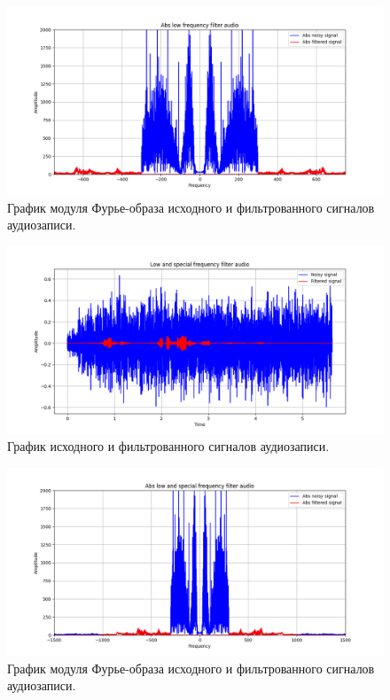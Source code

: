 \documentclass[a4paper, 12pt]{article}
\begin{document}
    \begin{figure}[!htb]
        \centering
        \includegraphics[scale=0.485]{abs_u_U_audio.png}
        \captionsetup{skip=0pt}
        \caption{График модуля Фурье-образа исходного и фильтрованного сигналов аудиозаписи.}
        \label{fig:fig114}
    \end{figure}
    \begin{figure}[!htb]
        \centering
        \includegraphics[scale=0.485]{u_flt_u_audio_v2.png}
        \captionsetup{skip=0pt}
        \caption{График исходного и фильтрованного сигналов аудиозаписи.}
        \label{fig:fig115}
    \end{figure}
    \begin{figure}[!htb]
        \centering
        \includegraphics[scale=0.485]{abs_u_U_audio_v2.png}
        \captionsetup{skip=0pt}
        \caption{График модуля Фурье-образа исходного и фильтрованного сигналов аудиозаписи.}
        \label{fig:fig116}
    \end{figure}
\end{document}
